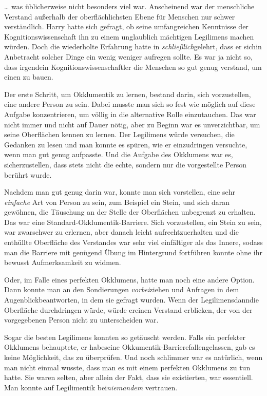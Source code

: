 {… was üblicherweise nicht besonders viel war. Anscheinend war der menschliche Verstand außerhalb der oberflächlichsten Ebene für Menschen nur schwer verständlich. Harry hatte sich gefragt, ob seine umfangreichen Kenntnisse der Kognitionswissenschaft ihn zu einem unglaublich mächtigen Legilimens machen würden. Doch die wiederholte Erfahrung hatte in \emph{schließlich}gelehrt, dass er sichin Anbetracht solcher Dinge ein wenig weniger aufregen sollte. Es war ja nicht so, dass irgendein Kognitionswissenschaftler die Menschen so gut genug verstand, um einen zu bauen.

Der erste Schritt, um Okklumentik zu lernen, bestand darin, sich vorzustellen, eine andere Person zu sein. Dabei musste man sich so fest wie möglich auf diese Aufgabe konzentrieren, um völlig in die alternative Rolle einzutauchen. Das war nicht immer und nicht auf Dauer nötig, aber zu Beginn war es unverzichtbar, um seine Oberflächen kennen zu lernen. Der Legilimens würde versuchen, die Gedanken zu lesen und man konnte es spüren, wie er einzudringen versuchte, wenn man gut genug aufpasste. Und die Aufgabe des Okklumens war es, sicherzustellen, dass stets nicht die echte, sondern nur die vorgestellte Person berührt wurde.

Nachdem man gut genug darin war, konnte man sich vorstellen, eine sehr \emph{einfache} Art von Person zu sein, zum Beispiel ein Stein, und sich daran gewöhnen, die Täuschung an der Stelle der Oberflächen unbegrenzt zu erhalten. Das war eine Standard-Okklumentik-Barriere. Sich vorzustellen, ein Stein zu sein, war zwarschwer zu erlernen, aber danach leicht aufrechtzuerhalten und die enthüllte Oberfläche des Verstandes war sehr viel einfältiger als das Innere, sodass man die Barriere mit genügend Übung im Hintergrund fortführen konnte ohne ihr bewusst Aufmerksamkeit zu widmen.

Oder, im Falle eines perfekten Okklumens, hatte man noch eine andere Option. Dann konnte man an den Sondierungen \emph{vorbei}ziehen und Anfragen in dem Augenblickbeantworten, in dem sie gefragt wurden. Wenn der Legilimensdanndie Oberfläche durchdringen würde, würde ereinen Verstand erblicken, der von der vorgegebenen Person nicht zu unterscheiden war.

Sogar die besten Legilimens konnten so getäuscht werden. Falls ein perfekter Okklumens behauptete, er habeseine Okkumentik-Barrierefallengelassen, gab es keine Möglichkeit, das zu überprüfen. Und noch schlimmer war es natürlich, wenn man nicht einmal wusste, dass man es mit einem perfekten Okklumens zu tun hatte. Sie waren selten, aber allein der Fakt, dass sie existierten, war essentiell. Man konnte auf Legilimentik bei\emph{niemandem} vertrauen.

}
